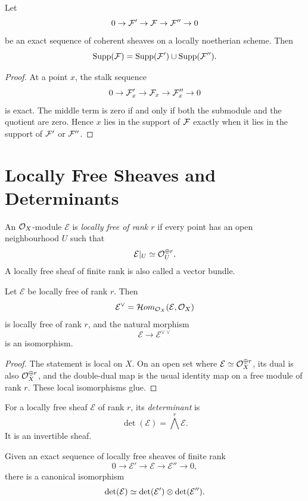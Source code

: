 \begin{proposition}
Let
\[
    0\to\mathcal{F}'\to\mathcal{F}\to\mathcal{F}''\to0
\]
be an exact sequence of coherent sheaves on a locally noetherian scheme.  Then
\[
    \operatorname{Supp}(\mathcal{F})=\operatorname{Supp}(\mathcal{F}')\cup\operatorname{Supp}(\mathcal{F}'').
\]
\end{proposition}

\begin{proof}
At a point \(x\), the stalk sequence
\[
    0\to\mathcal{F}'_x\to\mathcal{F}_x\to\mathcal{F}''_x\to0
\]
is exact.  The middle term is zero if and only if both the submodule and the
quotient are zero.  Hence \(x\) lies in the support of \(\mathcal{F}\) exactly when it
lies in the support of \(\mathcal{F}'\) or \(\mathcal{F}''\).
\end{proof}

\section{Locally Free Sheaves and Determinants}

\begin{definition}
An \(\mathcal{O}_X\)-module \(\mathcal E\) is \emph{locally free of rank \(r\)} if
every point has an open neighbourhood \(U\) such that
\[
    \mathcal E|_U\simeq \mathcal{O}_U^{\oplus r}.
\]
A locally free sheaf of finite rank is also called a vector bundle.
\end{definition}

\begin{proposition}
Let \(\mathcal E\) be locally free of rank \(r\).  Then
\[
    \mathcal E^\vee=\mathcal{H}om_{\mathcal{O}_X}(\mathcal E,\mathcal{O}_X)
\]
is locally free of rank \(r\), and the natural morphism
\[
    \mathcal E\longrightarrow \mathcal E^{\vee\vee}
\]
is an isomorphism.
\end{proposition}

\begin{proof}
The statement is local on \(X\).  On an open set where
\(\mathcal E\simeq\mathcal{O}_X^{\oplus r}\), its dual is also
\(\mathcal{O}_X^{\oplus r}\), and the double-dual map is the usual identity map on a
free module of rank \(r\).  These local isomorphisms glue.
\end{proof}

\begin{definition}
For a locally free sheaf \(\mathcal E\) of rank \(r\), its
\emph{determinant} is
\[
    \det(\mathcal E)=\bigwedge^r\mathcal E.
\]
It is an invertible sheaf.
\end{definition}

\begin{proposition}
Given an exact sequence of locally free sheaves of finite rank
\[
    0\to\mathcal E'\to\mathcal E\to\mathcal E''\to0,
\]
there is a canonical isomorphism
\[
    \det(\mathcal E)\simeq
    \det(\mathcal E')\otimes\det(\mathcal E'').
\]
\end{proposition}

